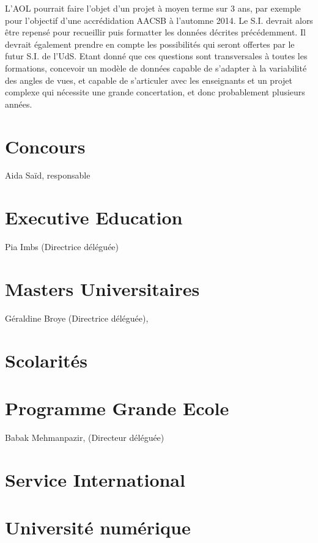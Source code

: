 \documentclass{book}
\begin{document}
L'AOL pourrait faire l'objet d'un projet à moyen terme sur 3 ans, par exemple
pour l'objectif d'une accrédidation AACSB à l'automne 2014. Le S.I. devrait
alors être repensé pour recueillir puis formatter les données décrites
précédemment. Il devrait également prendre en compte les possibilités qui 
seront offertes par le futur S.I.  de l'UdS.
Etant donné que ces questions sont transversales à toutes les formations, 
concevoir un modèle de données capable de s'adapter à la variabilité des
angles de vues, et capable de s'articuler avec les enseignants et un projet
complexe qui nécessite une grande concertation, et donc probablement 
plusieurs années.







\section{Concours }
Aida Saïd, responsable


\section{Executive Education }
Pia Imbs (Directrice déléguée)

\section{Masters Universitaires}
Géraldine Broye (Directrice déléguée),

 
\section{Scolarités}

\section{Programme Grande Ecole}
Babak Mehmanpazir, (Directeur déléguée)

\section{Service International}

\section{Université numérique}
\end{document}
